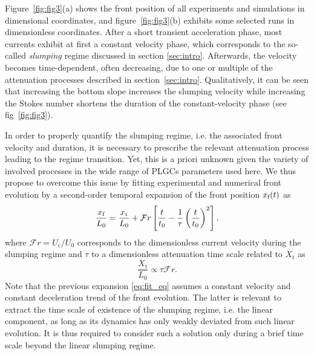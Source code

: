 \documentclass[12pt]{article}
\begin{document}
Figure~\ref{fig:fig3}(a) shows the front position of all experiments and simulations in dimensional coordinates, and figure~\ref{fig:fig3}(b) exhibits some selected runs in dimensionless coordinates. After a short transient acceleration phase, most currents exhibit at first a constant velocity phase, which corresponds to the so-called \emph{slumping} regime discussed in section \ref{sec:intro}. Afterwards, the velocity becomes time-dependent, often decreasing, due to one or multiple of the attenuation processes described in section~\ref{sec:intro}.
%
Qualitatively, it can be seen that increasing the bottom slope increases the slumping velocity while increasing the Stokes number shortens the duration of the constant-velocity phase (see fig~\ref{fig:fig3}).

In order to properly quantify the slumping regime, i.e. the associated front velocity and duration, it is necessary to prescribe the relevant attenuation process leading to the regime transition. Yet, this is a priori unknown given the variety of involved processes in the wide range of PLGCs parameters used here. We thus propose to overcome this issue by fitting experimental and numerical front evolution by a second-order temporal expansion of the front position $x_{\text f}(t)$ as
\begin{equation}
	\label{eq:fit_eq}
	\frac{x_{\text f}}{L_{0}} = \frac{x_{i}}{L_0} + \mathcal{F}r \left[\frac{t}{t_{0}} - \frac{1}{\tau} \left(\frac{t}{t_{0}}\right)^{2}\right],
\end{equation}
where $\mathcal{F}r = U_{\text{c}}/U_{0}$ corresponds to the dimensionless current velocity during the slumping regime and $\tau$ to a dimensionless attenuation time scale related to $X_{\text{t}}$ as
\begin{equation}
	\label{eq:link_Xt_tau}
	\frac{X_{\text{t}}}{L_{0}} \propto \tau\mathcal{F}r.
\end{equation}
Note that the previous expansion \eqref{eq:fit_eq} assumes a constant velocity and constant deceleration trend of the front evolution. The latter is relevant to extract the time scale of existence of the slumping regime, i.e. the linear component, as long as its dynamics has only weakly deviated from such linear evolution. It is thus required to consider such a solution only during a brief time scale beyond the linear slumping regime.
\end{document}
